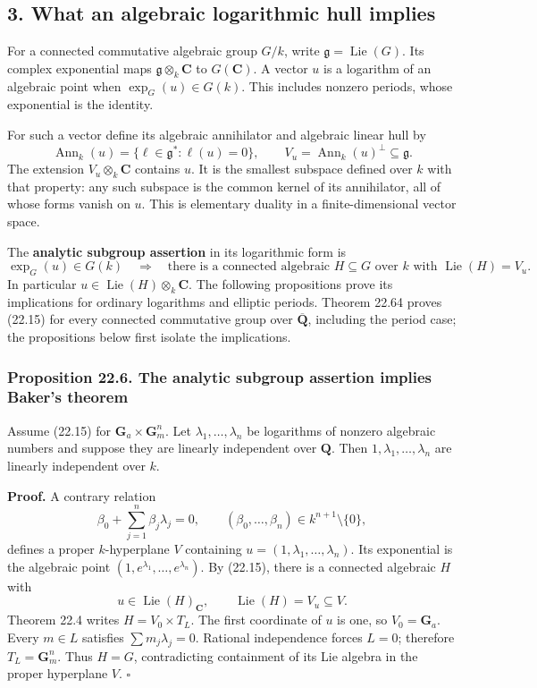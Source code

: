 \documentclass[
  11pt,
  a4paper,
]{article}
\begin{document}
\subsection{3. What an algebraic logarithmic hull
implies}\label{what-an-algebraic-logarithmic-hull-implies}

For a connected commutative algebraic group \(G/k\), write
\(\mathfrak g=\operatorname{Lie}(G)\). Its complex exponential maps
\(\mathfrak g\otimes_k\mathbf C\) to \(G(\mathbf C)\). A vector \(u\) is
a logarithm of an algebraic point when \(\exp_G(u)\in G(k)\). This
includes nonzero periods, whose exponential is the identity.

For such a vector define its algebraic annihilator and algebraic linear
hull by \[
 \operatorname{Ann}_k(u)=\{\ell\in\mathfrak g^*: \ell(u)=0\},
 \qquad
 V_u=\operatorname{Ann}_k(u)^\perp\subseteq\mathfrak g.
 \tag{22.14}
\] The extension \(V_u\otimes_k\mathbf C\) contains \(u\). It is the
smallest subspace defined over \(k\) with that property: any such
subspace is the common kernel of its annihilator, all of whose forms
vanish on \(u\). This is elementary duality in a finite-dimensional
vector space.

The \textbf{analytic subgroup assertion} in its logarithmic form is \[
 \exp_G(u)\in G(k)
 \quad\Longrightarrow\quad
 \text{there is a connected algebraic }H\subseteq G
 \text{ over }k\text{ with }\operatorname{Lie}(H)=V_u.
 \tag{22.15}
\] In particular \(u\in\operatorname{Lie}(H)\otimes_k\mathbf C\). The
following propositions prove its implications for ordinary logarithms
and elliptic periods. Theorem 22.64 proves (22.15) for every connected
commutative group over \(\overline{\mathbf Q}\), including the period
case; the propositions below first isolate the implications.

\subsubsection{Proposition 22.6. The analytic subgroup assertion implies
Baker's
theorem}\label{proposition-22.6.-the-analytic-subgroup-assertion-implies-bakers-theorem}

Assume (22.15) for \(\mathbf G_a\times\mathbf G_m^n\). Let
\(\lambda_1,\ldots,\lambda_n\) be logarithms of nonzero algebraic
numbers and suppose they are linearly independent over \(\mathbf Q\).
Then \(1,\lambda_1,\ldots,\lambda_n\) are linearly independent over
\(k\).

\textbf{Proof.} A contrary relation \[
 \beta_0+\sum_{j=1}^n\beta_j\lambda_j=0,
 \qquad (\beta_0,\ldots,\beta_n)\in k^{n+1}\setminus\{0\},
 \tag{22.16}
\] defines a proper \(k\)-hyperplane \(V\) containing
\(u=(1,\lambda_1,\ldots,\lambda_n)\). Its exponential is the algebraic
point \((1,e^{\lambda_1},\ldots,e^{\lambda_n})\). By (22.15), there is a
connected algebraic \(H\) with \[
 u\in\operatorname{Lie}(H)_{\mathbf C},\qquad
 \operatorname{Lie}(H)=V_u\subseteq V.
\] Theorem 22.4 writes \(H=V_0\times T_L\). The first coordinate of
\(u\) is one, so \(V_0=\mathbf G_a\). Every \(m\in L\) satisfies
\(\sum m_j\lambda_j=0\). Rational independence forces \(L=0\); therefore
\(T_L=\mathbf G_m^n\). Thus \(H=G\), contradicting containment of its
Lie algebra in the proper hyperplane \(V\). \(\square\)
\end{document}
